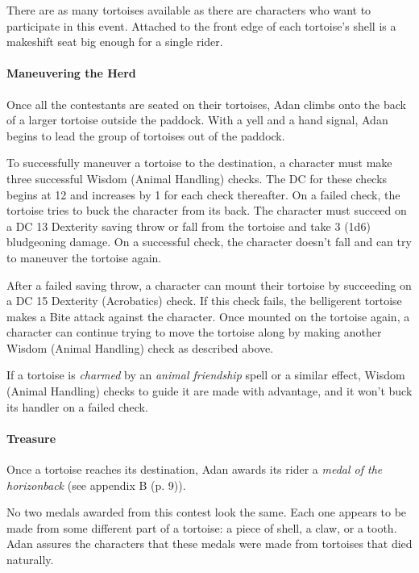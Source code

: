 \documentclass[letterpaper, 11pt, bg=full, twocolumn]{dndbook}
\begin{document}
There are as many tortoises available as there are characters who want to participate in this event. Attached to the front edge of each tortoise's shell is a makeshift seat big enough for a single rider.

\paragraph{Maneuvering the Herd}

Once all the contestants are seated on their tortoises, Adan climbs onto the back of a larger tortoise outside the paddock. With a yell and a hand signal, Adan begins to lead the group of tortoises out of the paddock.

To successfully maneuver a tortoise to the destination, a character must make three successful Wisdom (Animal Handling) checks. The DC for these checks begins at 12 and increases by 1 for each check thereafter. On a failed check, the tortoise tries to buck the character from its back. The character must succeed on a DC 13 Dexterity saving throw or fall from the tortoise and take 3 (1d6) bludgeoning damage. On a successful check, the character doesn't fall and can try to maneuver the tortoise again.

After a failed saving throw, a character can mount their tortoise by succeeding on a DC 15 Dexterity (Acrobatics) check. If this check fails, the belligerent tortoise makes a Bite attack against the character. Once mounted on the tortoise again, a character can continue trying to move the tortoise along by making another Wisdom (Animal Handling) check as described above.

If a tortoise is \textit{charmed} by an \textit{animal friendship} spell or a similar effect, Wisdom (Animal Handling) checks to guide it are made with advantage, and it won't buck its handler on a failed check.

\paragraph{Treasure}

Once a tortoise reaches its destination, Adan awards its rider a \textit{medal of the horizonback} (see appendix B (p. 9)).

No two medals awarded from this contest look the same. Each one appears to be made from some different part of a tortoise: a piece of shell, a claw, or a tooth. Adan assures the characters that these medals were made from tortoises that died naturally.
\end{document}
